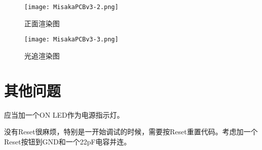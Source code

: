 \begin{figure}[htbp]
    \centering
    \texttt{[image: MisakaPCBv3-2.png]}
    \caption{正面渲染图}
    \label{fig:MisakaPCBv3-2}
\end{figure}

\begin{figure}[htbp]
    \centering
    \texttt{[image: MisakaPCBv3-3.png]}
    \caption{光追渲染图}
    \label{fig:MisakaPCBv3-3}
\end{figure}

\section{其他问题}

应当加一个ON LED作为电源指示灯。

没有Reset很麻烦，特别是一开始调试的时候，需要按Reset重置代码。考虑加一个Reset按钮到GND和一个22pF电容并连。
